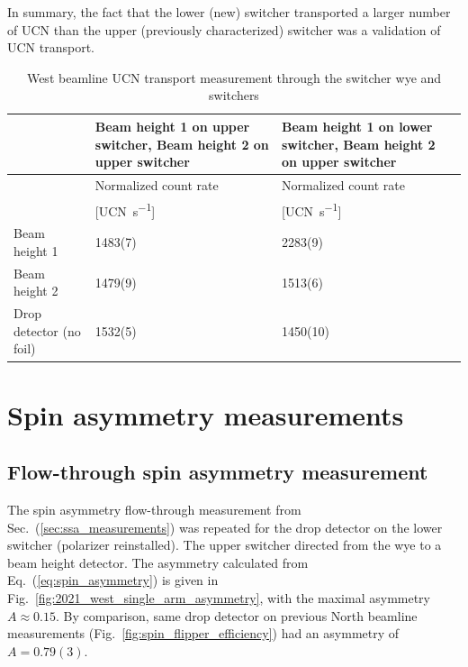 In summary, the fact that the lower (new) switcher transported a larger number of UCN than the upper (previously characterized) switcher was a validation of UCN transport.

\begin{table}
    \centering
    \caption{West beamline UCN transport measurement through the switcher wye and switchers}\label{tb:2021_transport}
    \begin{tabular}{
        l  
        p{2in}
        p{2in}
    }
    \toprule
        & {\small Beam height 1 on upper switcher, Beam height 2 on upper switcher} & {\small Beam height 1 on lower switcher, Beam height 2 on upper switcher} \\
    \midrule
        & {Normalized count rate} & {Normalized count rate} \\
        & {[\unit{UCN\per \second}]} & {[\unit{UCN\per \second}]} \\
    \midrule
        Beam height 1 &  1483(7) & 2283(9)\\
        Beam height 2 &  1479(9) & 1513(6)\\
        Drop detector (no foil) & 1532(5) & 1450(10)\\
    \bottomrule
    \end{tabular}
\end{table}


\section{Spin asymmetry measurements}\label{sec:asymmetry_west_2021}



\subsection{Flow-through spin asymmetry measurement}\label{sec:single_arm_flow_through_west_2021}


The spin asymmetry flow-through measurement from Sec.~(\ref{sec:ssa_measurements}) was repeated for the drop detector on the lower switcher (polarizer reinstalled). The upper switcher directed \ucn from the wye to a beam height detector. The asymmetry calculated from Eq.~(\ref{eq:spin_asymmetry}) is given in Fig.~\ref{fig:2021_west_single_arm_asymmetry}, with the maximal asymmetry $A\approx 0.15$. By comparison, same drop detector on previous North beamline measurements (Fig.~\ref{fig:spin_flipper_efficiency}) had an asymmetry of $A= 0.79(3)$.

